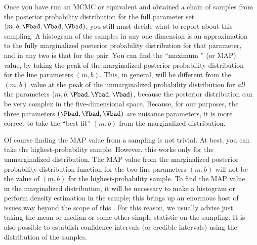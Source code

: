 \documentclass[12pt,twoside,pdftex]{article}
\begin{document}
Once you have run an MCMC or equivalent and obtained a chain of
samples from the posterior probability distribution for the full
parameter set $(m,b,\Pbad,\Ybad,\Vbad)$, you still must decide what to
report about this sampling.  A histogram of the samples in any one
dimension is an approximation to the fully marginalized posterior
probability distribution for that parameter, and in any two is that
for the pair.  You can find the ``maximum \aposteriori'' (or MAP)
value, by taking the peak of the marginalized posterior probability
distribution for the line parameters $(m,b)$.  This, in general, will
be different from the $(m,b)$ value at the peak of the unmarginalized
probability distribution for \emph{all} the parameters
$(m,b,\Pbad,\Ybad,\Vbad)$, because the posterior distribution can be
very complex in the five-dimensional space.  Because, for our
purposes, the three parameters $(\Pbad,\Ybad,\Vbad)$ are nuisance
parameters, it is more correct to take the ``best-fit'' $(m,b)$ from
the marginalized distribution.

Of course finding the MAP value from a sampling is not trivial.  At
best, you can take the highest-probability sample.  However, this
works only for the unmarginalized distribution.  The MAP value from
the marginalized posterior probability distribution function for the
two line parameters $(m,b)$ will not be the value of $(m,b)$ for the
highest-probability sample.  To find the MAP value in the marginalized
distribution, it will be necessary to make a histogram or perform
density estimation in the sample; this brings up an enormous host of
issues way beyond the scope of this \documentname.  For this reason,
we usually advise just taking the mean or median or some other simple
statistic on the sampling.  It is also possible to establish
confidence intervals (or credible intervals) using the distribution of
the samples.
\end{document}
